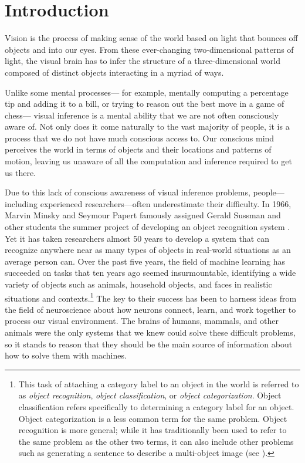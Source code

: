 \chapter{Introduction}

Vision is the process of making sense of the world
based on light that bounces off objects and into our eyes.
From these ever-changing two-dimensional patterns of light,
the visual brain has to infer the structure of a three-dimensional world
composed of distinct objects interacting in a myriad of ways.

Unlike some mental processes---%
for example, mentally computing a percentage tip and adding it to a bill,
or trying to reason out the best move in a game of chess---%
visual inference is a mental ability that we are not often consciously aware of.
Not only does it come naturally to the vast majority of people,
it is a process that we do not have much conscious access to.
Our conscious mind perceives the world in terms of objects
and their locations and patterns of motion,
leaving us unaware of all the computation and inference
required to get us there.

Due to this lack of conscious awareness of visual inference problems,
people---including experienced researchers---often underestimate their difficulty.
In 1966, Marvin Minsky and Seymour Papert famously assigned Gerald Sussman
and other students the summer project of developing an object recognition system \parencite{Papert1966}.
Yet it has taken researchers almost 50 years
to develop a system that can recognize anywhere near as many types of objects
in real-world situations as an average person can.
Over the past five years, the field of machine learning has succeeded on tasks
that ten years ago seemed insurmountable,
identifying a wide variety of objects such as animals, household objects, and faces
in realistic situations and contexts.\footnote{
  This task of attaching a category label to an object in the world
  is referred to as \emph{object recognition}, \emph{object classification},
  or \emph{object categorization}.
  Object classification refers specifically to determining a category label
  for an object.
  Object categorization is a less common term for the same problem.
  Object recognition is more general;
  while it has traditionally been used to refer to the same problem
  as the other two terms,
  it can also include other problems such as generating a sentence to describe
  a multi-object image (see ).}
The key to their success has been to harness ideas from the field of neuroscience
about how neurons connect, learn, and work together
to process our visual environment.
The brains of humans, mammals, and other animals were the only systems
that we knew could solve these difficult problems,
so it stands to reason that they should be the main source of information
about how to solve them with machines.

